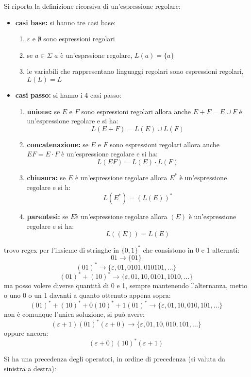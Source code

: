 \documentclass[a4paper,12pt, oneside]{book}
\begin{document}
\begin{definizione}
Si riporta la definizione ricorsiva di un'espressione regolare:
\begin{itemize}
\item \textbf{casi base:} si hanno tre casi base:
\begin{enumerate}
\item $\varepsilon$ e $\emptyset$ sono espressioni regolari
\item se $a\in \Sigma$ $a$ è un'esprssione regolare, $L(a)=\{a\}$
\item le variabili che rappresentano linguaggi regolari sono espressioni regolari, $L(L)=L$
\end{enumerate}
\item \textbf{casi passo:} si hanno i 4 casi passo:
\begin{enumerate}
\item \textbf{unione:} se $E$ e $F$ sono espressioni regolari allora anche $E+F=E\cup F$ è un'espressione regolare e si ha:
$$L(E+F)=L(E)\cup L(F)$$
\item \textbf{concatenazione:} se $E$ e $F$ sono espressioni regolari allora anche $EF=E\cdot F$ è un'espressione regolare e si ha:
$$L(EF)=L(E)\cdot L(F)$$
\item \textbf{chiusura:} se $E$ è un'espressione regolare allora $E^*$ è un'espressione regolare e si h:
$$L(E^*)=(L(E))^*$$
\item \textbf{parentesi:} se $E$è un'espressione regolare allora $(E)$ è un'espressione regolare e si ha:
$$L((E))=L(E)$$
\end{enumerate}
\end{itemize}
\newpage
\begin{esempio}
trovo regex per l'insieme di stringhe in $\{0,1\}^*$ che consistono in 0 e 1 alternati:\\
$$01\to \{01\}$$
$$(01)^*\to \{\varepsilon, 01, 0101,010101,...\}$$
$$(01)^*+(10)^*\to\{\varepsilon, 01,10,0101,1010,...\}$$
ma posso volere diverse quantità di 0 e 1, sempre mantenendo l'alternanza, metto o uno 0 o un 1 davanti a quanto ottenuto appena sopra:
$$(01)^*+(10)^*+0(10)^*+1(01)^*\to \{\varepsilon,01,10,010,101,...\}$$
non è comunque l'unica soluzione, si può avere:
$$(\varepsilon+1)(01)^*(\varepsilon+0)\to \{\varepsilon,01,10,010,101,...\}$$
oppure ancora:
$$(\varepsilon+0)(10)^*(\varepsilon+1)$$
\end{esempio}
\end{definizione}
Si ha una precedenza degli operatori, in ordine di precedenza (si valuta da sinistra a destra):
\end{document}
